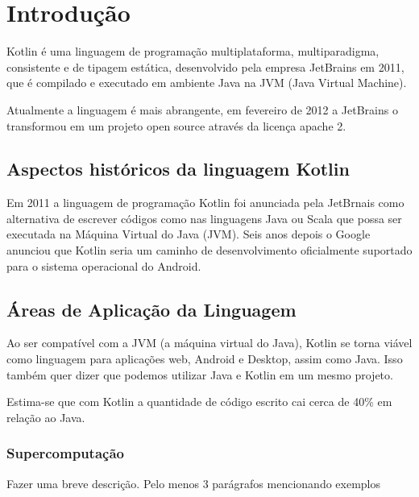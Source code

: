 

\chapter{ Introdu\c{c}\~{a}o}

Kotlin é uma linguagem de programação multiplataforma,
multiparadigma, consistente e de tipagem estática, 
desenvolvido pela empresa JetBrains em 2011, que é
compilado e executado em ambiente Java na JVM 
(Java Virtual Machine). 

Atualmente a linguagem é mais 
abrangente, em fevereiro de 2012 a JetBrains  o transformou
em um projeto open source através da licença apache 2.


\section{Aspectos hist\'{o}ricos da linguagem Kotlin}
Em 2011 a linguagem de programaç\~{a}o Kotlin foi anunciada pela JetBrnais como alternativa
de escrever códigos como nas linguagens Java ou Scala que possa ser executada na Máquina Virtual do Java
(JVM). Seis anos depois o Google anunciou que Kotlin seria um caminho de 
desenvolvimento oficialmente suportado para o sistema operacional do Android.\cite{ebel2019mastering} 

\section{\'{A}reas de Aplica\c{c}\~{a}o da Linguagem}
Ao ser compatível com a JVM (a máquina virtual do Java), 
Kotlin se torna viável como linguagem para aplicações web, 
Android e Desktop, assim como Java. Isso também quer dizer 
que podemos utilizar Java e Kotlin em um mesmo projeto. 

Estima-se que com Kotlin a quantidade de código escrito
cai cerca de 40\% em relação ao Java. 

\subsection{ Supercomputa\c{c}\~{a}o}



Fazer uma breve descri\c{c}\~{a}o. Pelo menos 3 par\'{a}grafos mencionando exemplos

